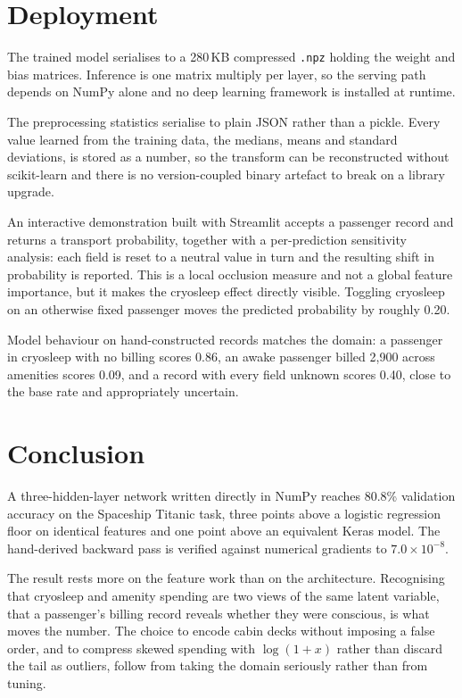 \documentclass[11pt,a4paper]{article}
\begin{document}
\section{Deployment}

The trained model serialises to a 280\,KB compressed \texttt{.npz} holding the
weight and bias matrices. Inference is one matrix multiply per layer, so the
serving path depends on NumPy alone and no deep learning framework is installed
at runtime.

The preprocessing statistics serialise to plain JSON rather than a pickle. Every
value learned from the training data, the medians, means and standard deviations,
is stored as a number, so the transform can be reconstructed without
scikit-learn and there is no version-coupled binary artefact to break on a
library upgrade.

An interactive demonstration built with Streamlit accepts a passenger record and
returns a transport probability, together with a per-prediction sensitivity
analysis: each field is reset to a neutral value in turn and the resulting shift
in probability is reported. This is a local occlusion measure and not a global
feature importance, but it makes the cryosleep effect directly visible. Toggling
cryosleep on an otherwise fixed passenger moves the predicted probability by
roughly 0.20.

Model behaviour on hand-constructed records matches the domain: a passenger in
cryosleep with no billing scores 0.86, an awake passenger billed 2{,}900 across
amenities scores 0.09, and a record with every field unknown scores 0.40, close
to the base rate and appropriately uncertain.

\section{Conclusion}

A three-hidden-layer network written directly in NumPy reaches 80.8\% validation
accuracy on the Spaceship Titanic task, three points above a logistic regression
floor on identical features and one point above an equivalent Keras model. The
hand-derived backward pass is verified against numerical gradients to
$7.0\times10^{-8}$.

The result rests more on the feature work than on the architecture. Recognising
that cryosleep and amenity spending are two views of the same latent variable,
that a passenger's billing record reveals whether they were conscious, is what
moves the number. The choice to encode cabin decks without imposing a false
order, and to compress skewed spending with $\log(1+x)$ rather than discard the
tail as outliers, follow from taking the domain seriously rather than from
tuning.
\end{document}
